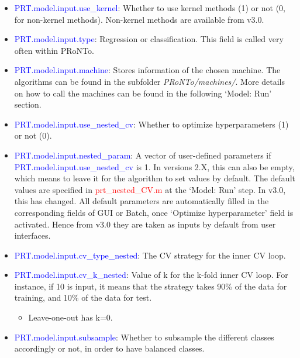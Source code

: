 \begin{itemize}
 
\item \textcolor{blue}{PRT.model.input.use\_kernel}: Whether to use kernel methods (1) or not (0, for non-kernel methods). Non-kernel methods are available from v3.0.

\item \textcolor{blue}{PRT.model.input.type}: Regression or classification. This field is called very often within PRoNTo.

\item \textcolor{blue}{PRT.model.input.machine}: Stores information of the chosen machine. The algorithms can be found in the subfolder \textit{PRoNTo/machines/}. More details on how to call the machines can be found in the following `Model: Run' section. 

\item \textcolor{blue}{PRT.model.input.use\_nested\_cv}: Whether to optimize hyperparameters (1) or not (0).

\item \textcolor{blue}{PRT.model.input.nested\_param}: A vector of user-defined parameters if \textcolor{blue}{PRT.model.input.use\_nested\_cv} is 1. In versions 2.X, this can also be empty, which means to leave it for the algorithm to set values by default. The default values are specified in \textcolor{red}{prt\_nested\_CV.m} at the `Model: Run' step. In v3.0, this has changed. All default parameters are automatically filled in the corresponding fields of GUI or Batch, once `Optimize hyperparameter' field is activated. Hence from v3.0 they are taken as inputs by default from user interfaces.

\item \textcolor{blue}{PRT.model.input.cv\_type\_nested}: The CV strategy for the inner CV loop.

\item \textcolor{blue}{PRT.model.input.cv\_k\_nested}: Value of k for the k-fold inner CV loop. For instance, if 10 is input, it means that the strategy takes 90\% of the data for training, and 10\% of the data for test.
\begin{itemize}
\item Leave-one-out has k=0.
\end{itemize}

\item \textcolor{blue}{PRT.model.input.subsample}: Whether to subsample the different classes accordingly or not, in order to have balanced classes.


\end{itemize}
